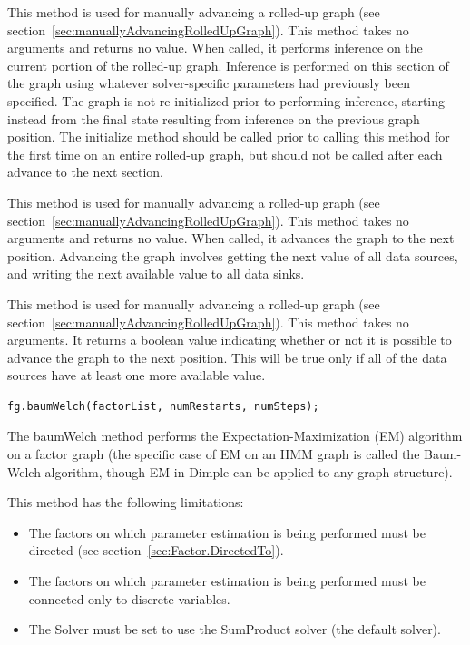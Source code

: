 
This method is used for manually advancing a rolled-up graph (see section~\ref{sec:manuallyAdvancingRolledUpGraph}).  This method takes no arguments and returns no value.  When called, it performs inference on the current portion of the rolled-up graph.  Inference is performed on this section of the graph using whatever solver-specific parameters had previously been specified.  The graph is not re-initialized prior to performing inference, starting instead from the final state resulting from inference on the previous graph position.  The initialize method should be called prior to calling this method for the first time on an entire rolled-up graph, but should not be called after each advance to the next section.


This method is used for manually advancing a rolled-up graph (see section~\ref{sec:manuallyAdvancingRolledUpGraph}).  This method takes no arguments and returns no value.  When called, it advances the graph to the next position.  Advancing the graph involves getting the next value of all data sources, and writing the next available value to all data sinks.


This method is used for manually advancing a rolled-up graph (see section~\ref{sec:manuallyAdvancingRolledUpGraph}).  This method takes no arguments.  It returns a boolean value indicating whether or not it is possible to advance the graph to the next position.  This will be true only if all of the data sources have at least one more available value.

\label{sec:FactorGraph.BaumWelch}

\begin{lstlisting}
fg.baumWelch(factorList, numRestarts, numSteps);
\end{lstlisting}

The baumWelch method performs the Expectation-Maximization (EM) algorithm on a factor graph (the specific case of EM on an HMM graph is called the Baum-Welch algorithm, though EM in Dimple can be applied to any graph structure).

This method has the following limitations:

\begin{itemize}
\item The factors on which parameter estimation is being performed must be directed (see section~\ref{sec:Factor.DirectedTo}).
\item The factors on which parameter estimation is being performed must be connected only to discrete variables.
\item The Solver must be set to use the SumProduct solver (the default solver).
\end{itemize}

